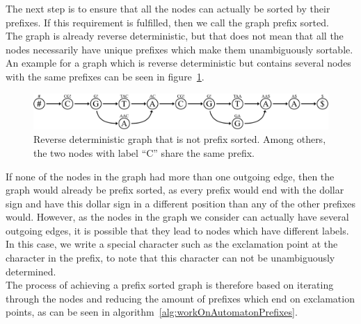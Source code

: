 \documentclass[a4paper,12pt,twoside,BCOR=10mm]{scrbook}
\begin{document}
The next step is to ensure that all the nodes can actually be sorted by their prefixes.
If this requirement is fulfilled, then we call the graph prefix sorted. \\
The graph is already reverse deterministic, but that does not mean that all the nodes
necessarily have unique prefixes which make them unambiguously sortable.
An example for a graph which is reverse deterministic but contains several nodes
with the same prefixes can be seen in figure~\ref{fig:evo_gml_rev_det_but_not_prev_sort}.
\begin{figure}[!htb]
\centering
\includegraphics[width=\textwidth]{evo_gml_rev_det_but_not_prev_sort.pdf}
\caption[Reverse deterministic graph that is not prefix sorted]{Reverse deterministic graph that is not prefix sorted. Among others, the two nodes with label \textup{“C”} share the same prefix.} \label{fig:evo_gml_rev_det_but_not_prev_sort}
\end{figure}
If none of the nodes in the graph had more than one outgoing edge, then the graph
would already be prefix sorted, as every prefix would end with the dollar sign
and have this dollar sign in a different position than any of the other prefixes would.
However, as the nodes in the graph we consider can actually have several outgoing edges,
it is possible that they lead to nodes which have different labels. In this case,
we write a special character such as the exclamation point at the character in the prefix,
to note that this character can not be unambiguously determined. \\
The process of achieving a prefix sorted graph is therefore based on iterating through
the nodes and reducing the amount of
prefixes which end on exclamation points, as can be seen in algorithm~\ref{alg:workOnAutomatonPrefixes}.
\end{document}
